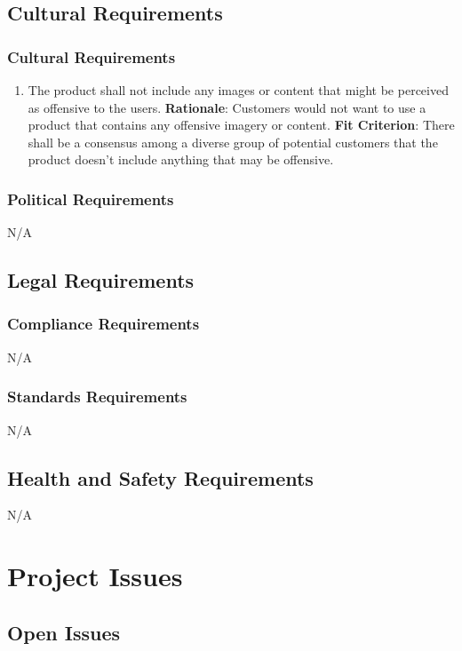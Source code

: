 \documentclass[12pt]{article}
\begin{document}
\subsection{Cultural Requirements}
\subsubsection{Cultural Requirements}
\begin{enumerate}[nfr]
    \item The product shall not include any images or content that might be perceived as offensive to the users.
    \newline \textbf{Rationale}: Customers would not want to use a product that contains any offensive imagery or content.
    \newline \textbf{Fit Criterion}: There shall be a consensus among a diverse group of potential customers that the product doesn't include anything that may be offensive.
\end{enumerate}

\subsubsection{Political Requirements}
N/A

\subsection{Legal Requirements}
\subsubsection{Compliance Requirements}
N/A

\subsubsection{Standards Requirements}
N/A

\subsection{Health and Safety Requirements}
N/A

\section{Project Issues} \label{sec:PI}

\subsection{Open Issues}
\end{document}
